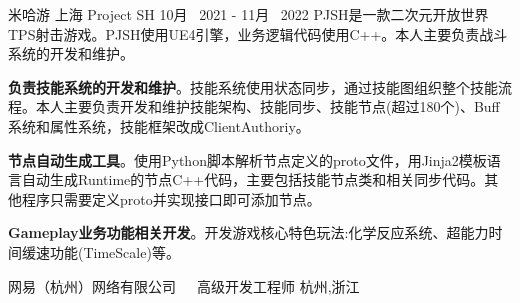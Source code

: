 


\begin{cventries}
	
\cventrycompany
{米哈游} %
{上海} %
\cventryproject
{Project SH} %
{10月~ 2021 - 11月~ 2022} %
{PJSH是一款二次元开放世界TPS射击游戏。PJSH使用UE4引擎，业务逻辑代码使用C++。本人主要负责战斗系统的开发和维护。}
{ %
	\begin{cvitems}
		\item {\textbf{负责技能系统的开发和维护}。技能系统使用状态同步，通过技能图组织整个技能流程。本人主要负责开发和维护技能架构、技能同步、技能节点(超过180个)、Buff系统和属性系统，技能框架改成ClientAuthoriy。 }
		\item{\textbf{节点自动生成工具}。使用Python脚本解析节点定义的proto文件，用Jinja2模板语言自动生成Runtime的节点C++代码，主要包括技能节点类和相关同步代码。其他程序只需要定义proto并实现接口即可添加节点。}
		\item{\textbf{Gameplay业务功能相关开发}。开发游戏核心特色玩法:化学反应系统、超能力时间缓速功能(TimeScale)等。}
	\end{cvitems}
}


\cventrycompany
{网易（杭州）网络有限公司~~~高级开发工程师} %
{杭州,浙江} %


\end{cventries}
